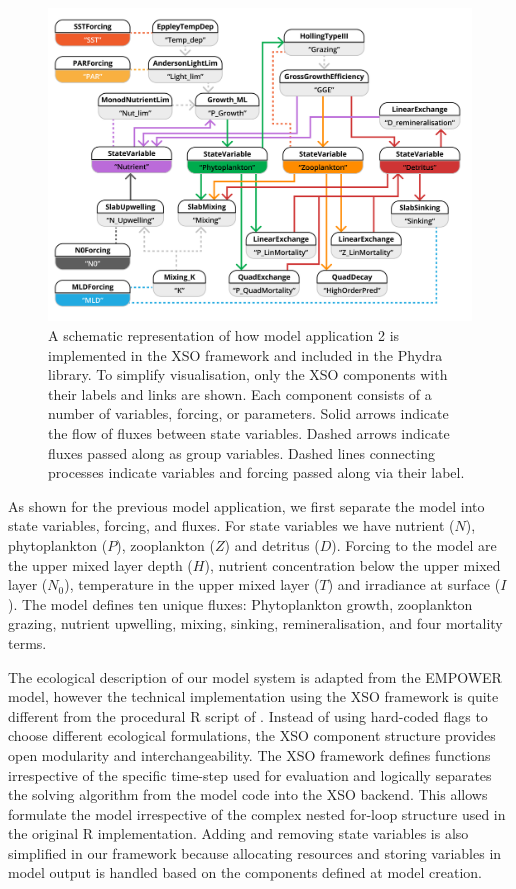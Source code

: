 \documentclass[journal abbreviation, manuscript]{copernicus}
\begin{document}
\begin{figure}[t]
\includegraphics[width=15cm]{Figures/firstdraft_schematics/code_schematics/EMPOWER.pdf}
\caption{A schematic representation of how model application 2 is implemented in the XSO framework and included in the Phydra library. To simplify visualisation, only the XSO components with their labels and links are shown. Each component consists of a number of variables, forcing, or parameters. Solid arrows indicate the flow of fluxes between state variables. Dashed arrows indicate fluxes passed along as group variables. Dashed lines connecting processes indicate variables and forcing passed along via their label.}
\label{Figure:CodeSchematics_2}
\end{figure}

As shown for the previous model application, we first separate the model into state variables, forcing, and fluxes. For state variables we have nutrient ($N$), phytoplankton ($P$), zooplankton ($Z$) and detritus ($D$). Forcing to the model are the upper mixed layer depth ($H$), nutrient concentration below the upper mixed layer ($N_0$), temperature in the upper mixed layer ($T$) and irradiance at surface ($I$). The model defines ten unique fluxes: Phytoplankton growth, zooplankton grazing, nutrient upwelling, mixing, sinking, remineralisation, and four mortality terms.

The ecological description of our model system is adapted from the EMPOWER model, however the technical implementation using the XSO framework is quite different from the procedural R script of \citet{Anderson2015c}. Instead of using hard-coded flags to choose different ecological formulations, the XSO component structure provides open modularity and interchangeability. The XSO framework defines functions irrespective of the specific time-step used for evaluation and logically separates the solving algorithm from the model code into the XSO backend. This allows formulate the model irrespective of the complex nested for-loop structure used in the original R implementation. Adding and removing state variables is also simplified in our framework because allocating resources and storing variables in model output is handled based on the components defined at model creation.
\end{document}
